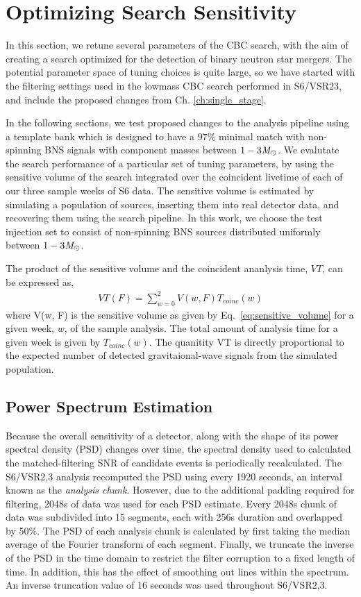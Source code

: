 \section{Optimizing Search Sensitivity}
\label{sec:tuning}

In this section, we retune several parameters of the CBC search, with the aim of creating a search optimized for the detection of binary neutron star mergers. The potential parameter space of tuning choices is quite large, so we have started with the filtering settings used in the lowmass CBC search performed in S6/VSR23, and include the proposed changes from Ch. \ref{ch:single_stage}. 

In the following sections, we test proposed changes to the analysis pipeline using a template bank which is designed to have a $97\%$ minimal match with non-spinning BNS signals with component masses between $1-3 \mathit{M}_\odot$. We evalutate the search performance of a particular set of tuning parameters, by using the  sensitive volume of the search integrated over the coincident livetime of each of our three sample weeks of S6 data. The sensitive volume is estimated by simulating a population of sources, inserting them into real detector data, and recovering them using the search pipeline. In this work, we choose the test injection set to consist of non-spinning BNS sources distributed uniformly between $1-3 \mathit{M}_\odot$.

The product of the sensitive volume and the coincident ananlysis time, $VT$, can be expressed as,
%
\begin{eqnarray}
VT (F) = \sum_{w=0}^2 V(w, F) T_{coinc}(w)
\end{eqnarray}
%
where V(w, F) is the sensitive volume as given by Eq.~\ref{eq:sensitive_volume} for a given week, $w$, of the sample analysis. The total amount of analysis time for a given week is given by $T_{coinc}(w)$. The quanitity VT is directly proportional to the expected number of detected gravitaional-wave signals from the simulated population. 

\subsection{Power Spectrum Estimation}
\label{sec:psd}

Because the overall sensitivity of a detector, along with the shape of its power spectral density (PSD) changes over time, the spectral density used to calculated the matched-filtering SNR of candidate events is periodically recalculated. The S6/VSR2,3 analysis recomputed the PSD using every 1920 seconds, an interval known as the \emph{analysis chunk}. However, due to the additional padding required for filtering, 2048s of data was used for each PSD estimate. Every 2048s chunk of data was subdivided into 15 segments, each with 256s duration and overlapped by 50$\%$. The PSD of each analysis chunk is calculated by first taking the median average of the Fourier transform of each segment. Finally, we truncate the inverse of the PSD in the time domain to restrict the filter corruption to a fixed length of time. In addition, this has the effect of smoothing out lines within the spectrum. An inverse truncation value of 16 seconds was used throughout S6/VSR2,3. 

